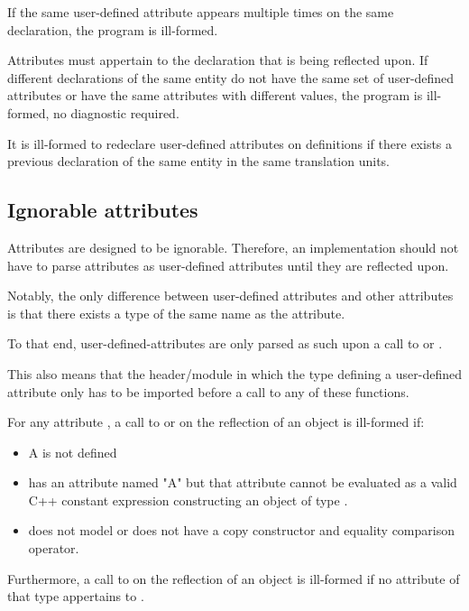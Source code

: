 \documentclass{wg21}
\begin{document}
If the same user-defined attribute appears multiple times on the same declaration, the program is ill-formed.

Attributes must appertain to the declaration that is being reflected upon.
If different declarations of the same entity do not have the same set of user-defined attributes or have the same attributes with different values, the program is ill-formed, no diagnostic required.

It is ill-formed to redeclare user-defined attributes on definitions if there exists a previous declaration of the same entity
in the same translation units.

\subsection{Ignorable attributes}

Attributes are designed to be ignorable.
Therefore, an implementation should not have to parse attributes as user-defined attributes until they are reflected upon.

Notably, the only difference between user-defined attributes and other attributes is that there exists
a type of the same name as the attribute. 

To that end, user-defined-attributes are only parsed as such upon a call to  
or .

This also means that the header/module in which the type defining a user-defined attribute only has to be imported before a call to any of these functions.

For any attribute , a call to  or  on the reflection of an object  is ill-formed if:
\begin{itemize}
    \item A is not defined
    \item {} has an attribute named "A" but that attribute cannot be evaluated as a valid C++ constant expression constructing an object of type .
    \item {} does not model  or does not have a  copy constructor and equality comparison operator.
\end{itemize}

Furthermore, a call to  on the reflection of an object  is ill-formed if no attribute of that type appertains to .
\end{document}
